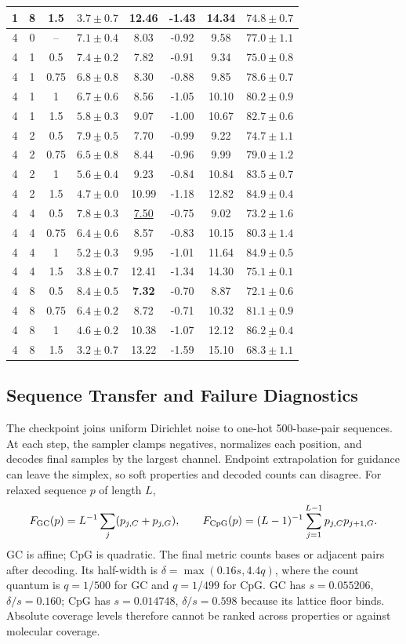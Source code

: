 \documentclass{article}
\begin{document}
\begin{table}[!htbp]
\begin{tabular}{cccccccc}
1 & 8 & 1.5 & $3.7\pm0.7$ & 12.46 & -1.43 & 14.34 & $74.8\pm0.7$\\
\midrule
4 & 0 & -- & $7.1\pm0.4$ & 8.03 & -0.92 & 9.58 & $77.0\pm1.1$\\
4 & 1 & 0.5 & $7.4\pm0.2$ & 7.82 & -0.91 & 9.34 & $75.0\pm0.8$\\
4 & 1 & 0.75 & $6.8\pm0.8$ & 8.30 & -0.88 & 9.85 & $78.6\pm0.7$\\
4 & 1 & 1 & $6.7\pm0.6$ & 8.56 & -1.05 & 10.10 & $80.2\pm0.9$\\
4 & 1 & 1.5 & $5.8\pm0.3$ & 9.07 & -1.00 & 10.67 & $82.7\pm0.6$\\
4 & 2 & 0.5 & $\underline{7.9\pm0.5}$& 7.70 & -0.99 & 9.22 & $74.7\pm1.1$\\
4 & 2 & 0.75 & $6.5\pm0.8$ & 8.44 & -0.96 & 9.99 & $79.0\pm1.2$\\
4 & 2 & 1 & $5.6\pm0.4$ & 9.23 & -0.84 & 10.84 & $83.5\pm0.7$\\
4 & 2 & 1.5 & $4.7\pm0.0$ & 10.99 & -1.18 & 12.82 & $84.9\pm0.4$\\
4 & 4 & 0.5 & $7.8\pm0.3$ & \underline{7.50}& -0.75 & 9.02 & $73.2\pm1.6$\\
4 & 4 & 0.75 & $6.4\pm0.6$ & 8.57 & -0.83 & 10.15 & $80.3\pm1.4$\\
4 & 4 & 1 & $5.2\pm0.3$ & 9.95 & -1.01 & 11.64 & $84.9\pm0.5$\\
4 & 4 & 1.5 & $3.8\pm0.7$ & 12.41 & -1.34 & 14.30 & $75.1\pm0.1$\\
4 & 8 & 0.5 & $\mathbf{8.4\pm0.5}$& \textbf{7.32}& -0.70 & 8.87 & $72.1\pm0.6$\\
4 & 8 & 0.75 & $6.4\pm0.2$ & 8.72 & -0.71 & 10.32 & $81.1\pm0.9$\\
4 & 8 & 1 & $4.6\pm0.2$ & 10.38 & -1.07 & 12.12 & $\underline{86.2\pm0.4}$\\
4 & 8 & 1.5 & $3.2\pm0.7$ & 13.22 & -1.59 & 15.10 & $68.3\pm1.1$\\
\bottomrule
\end{tabular}
\end{table}
\clearpage

\subsection{Sequence Transfer and Failure Diagnostics}\label{app:m2}
The checkpoint joins uniform Dirichlet noise to one-hot 500-base-pair sequences. At each step, the sampler clamps negatives, normalizes each position, and decodes final samples by the largest channel. Endpoint extrapolation for guidance can leave the simplex, so soft properties and decoded counts can disagree. For relaxed sequence $p$ of length $L$,
\[
 F_{\rm GC}(p)=L^{-1}\sum_j(p_{j,C}+p_{j,G}),\qquad
 F_{\rm CpG}(p)=(L-1)^{-1}\sum_{j=1}^{L-1}p_{j,C}p_{j+1,G}.
\]
GC is affine; CpG is quadratic. The final metric counts bases or adjacent pairs after decoding. Its half-width is $\delta=\max(0.16s,4.4q)$, where the count quantum is $q=1/500$ for GC and $q=1/499$ for CpG. GC has $s=0.055206$, $\delta/s=0.160$; CpG has $s=0.014748$, $\delta/s=0.598$ because its lattice floor binds. Absolute coverage levels therefore cannot be ranked across properties or against molecular coverage.
\end{document}
